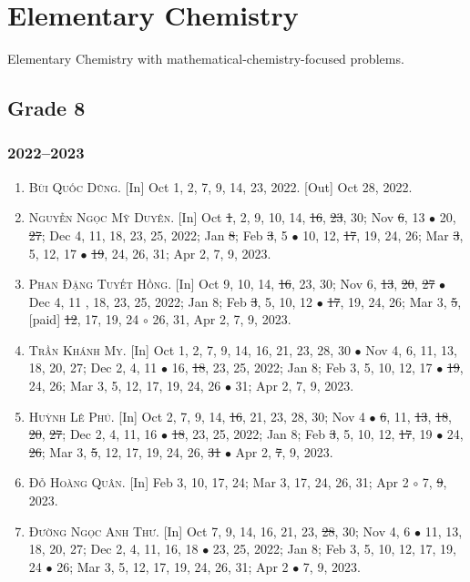 \documentclass{article}
\begin{document}
\section{Elementary Chemistry}
Elementary Chemistry with mathematical-chemistry-focused problems.

\subsection{Grade 8}

\subsubsection{2022--2023}

\begin{enumerate}
	\item \textsc{Bùi Quốc Dũng.} \textsf{[In]} Oct 1, 2, 7, 9, 14, 23, 2022. \textsf{[Out]} Oct 28, 2022.
	\item \textsc{Nguyễn Ngọc Mỹ Duyên.} \textsf{[In]} Oct \st{1}, 2, 9, 10, 14, \st{16}, \st{23}, 30; Nov \st{6}, 13 $\bullet$ 20, \st{27}; Dec 4, 11, 18, 23, 25, 2022; Jan \st{8}; Feb \st{3}, 5 $\bullet$ 10, 12, \st{17}, 19, 24, 26; Mar \st{3}, 5, 12, 17 $\bullet$ \st{19}, 24, 26, 31; Apr 2, 7, 9, 2023.
	\item \textsc{Phan Đặng Tuyết Hồng.} \textsf{[In]} Oct 9, 10, 14, \st{16}, 23, 30; Nov 6, \st{13}, \st{20}, \st{27} $\bullet$ Dec 4, 11 , 18, 23, 25, 2022; Jan 8; Feb \st{3}, 5, 10, 12 $\bullet$ \st{17}, 19, 24, 26; Mar 3, \st{5}, [paid] \st{12}, 17, 19, 24 $\circ$ 26, 31, Apr 2, 7, 9, 2023.
	\item \textsc{Trần Khánh My.} \textsf{[In]} Oct 1, 2, 7, 9, 14, 16, 21, 23, 28, 30 $\bullet$ Nov 4, 6, 11, 13, 18, 20, 27; Dec 2, 4, 11 $\bullet$ 16, \st{18}, 23, 25, 2022; Jan 8; Feb 3, 5, 10, 12, 17 $\bullet$ \st{19}, 24, 26; Mar 3, 5, 12, 17, 19, 24, 26 $\bullet$ 31; Apr 2, 7, 9, 2023.
	\item \textsc{Huỳnh Lê Phú.} \textsf{[In]} Oct 2, 7, 9, 14, \st{16}, 21, 23, 28, 30; Nov 4 $\bullet$ \st{6}, 11, \st{13}, \st{18}, \st{20}, \st{27}; Dec 2, 4, 11, 16 $\bullet$ \st{18}, 23, 25, 2022; Jan 8; Feb \st{3}, 5, 10, 12, \st{17}, 19 $\bullet$ 24, \st{26}; Mar 3, \st{5}, 12, 17, 19, 24, 26, \st{31} $\bullet$ Apr 2, \st{7}, 9, 2023.
	\item \textsc{Đỗ Hoàng Quân.} \textsf{[In]} Feb 3, 10, 17, 24; Mar 3, 17, 24, 26, 31; Apr 2 $\circ$ 7, \st{9}, 2023.
	\item \textsc{Đường Ngọc Anh Thư.} \textsf{[In]} Oct 7, 9, 14, 16, 21, 23, \st{28}, 30; Nov 4, 6 $\bullet$ 11, 13, 18, 20, 27; Dec 2, 4, 11, 16, 18 $\bullet$ 23, 25, 2022; Jan 8; Feb 3, 5, 10, 12, 17, 19, 24 $\bullet$ 26; Mar 3, 5, 12, 17, 19, 24, 26, 31; Apr 2 $\bullet$ 7, 9, 2023.
\end{enumerate}
\end{document}
